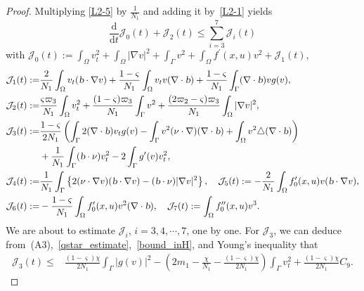 \documentclass{elsarticle}
\begin{document}
\begin{proof}
Multiplying \eqref{L2-5} by $\frac{1}{N_1}$ and adding it by~\eqref{L2-1} yields
\begin{equation}\label{L2-6}
\frac{\mathrm{d}}{\mathrm{d}t}\mathcal{J}_0(t) + \mathcal{J}_2(t) \leqslant \sum_{i=3}^7\mathcal{J}_i(t)
\end{equation}
with $\mathcal{J}_0(t):=\int_{\Omega}v_{t}^2+\int_{\Omega}|\nabla v|^2+\int_{\Gamma}v^2+\int_{\Omega}f^{\prime}(x, u)v^2 + \mathcal{J}_{1}(t)$, 
\begin{equation*}
\begin{split}
	\mathcal{J}_1(t):=&\frac{2}{N_1}\int_{\Omega}v_{t}(\textsl{b}\cdot\nabla v) + \frac{1-\varsigma}{N_1}\int_{\Omega}v_{t}v(\nabla\cdot\textsl{b} ) + \frac{1-\varsigma}{N_1}\int_{\Gamma} (\nabla\cdot \textsl{b} )vg(v),\\
	\mathcal{J}_2(t):=&\frac{\varsigma\varpi_3}{N_1}\int_{\Omega}v_{t}^2+\frac{(1-\varsigma)\varpi_3}{N_1}\int_{\Gamma}v^2+\frac{(2\varpi_2-\varsigma)\varpi_3}{N_1}\int_{\Omega}|\nabla v|^2,\\
	\mathcal{J}_3(t):=&\frac{1-\varsigma}{2N_1}\left(\int_{\Gamma}2 (\nabla\cdot \textsl{b} )v_{t}g(v) -\int_{\Gamma} v^2 (\nu\cdot \nabla)(\nabla\cdot \textsl{b} )+ \int_{\Omega} v^2\triangle(\nabla\cdot \textsl{b} )\right)\\
 & + \frac{1}{N_1}\int_{\Gamma}(\textsl{b}\cdot\nu)v_t^2-2\int_{\Gamma} g^{\prime}(v)v_t^2,\\
 	\mathcal{J}_4(t):=&\frac{1}{N_1}\int_{\Gamma}\left\{2(\nu\cdot\nabla v)(\textsl{b}\cdot\nabla v)-(\textsl{b}\cdot\nu)|\nabla v|^2\right\},\quad \mathcal{J}_5(t):=-\frac{2}{N_1}\int_{\Omega}f^{\prime}_0(x, u)v(\textsl{b}\cdot\nabla v),\\
	\mathcal{J}_6(t):=&- \frac{1-\varsigma}{N_1}\int_{\Omega}f^{\prime}_0(x, u)v^2(\nabla\cdot\textsl{b} ),\quad \mathcal{J}_7(t):=\int_{\Omega}f_0^{\prime\prime}(x, u)v^3.
\end{split}
\end{equation*}
We are about to estimate $\mathcal{J}_i$, $i=3, 4, \cdots, 7$, one by one. For $\mathcal{J}_3$, we can deduce from~(A3),~\eqref{qstar_estimate},~\eqref{bound_inH}, and Young's inequality that
\begin{equation*}
\begin{split}
\mathcal{J}_3(t)\leqslant& \frac{(1-\varsigma)\chi}{2N_1}\int_{\Gamma}|g(v)|^2 -(2m_1-\frac{\chi}{N_1}-\frac{(1-\varsigma)\chi}{2N_1})\int_{\Gamma} v_t^2+ \frac{(1-\varsigma)\chi}{2N_1}C_9.
\end{split}
\end{equation*}

\end{proof}
\end{document}
